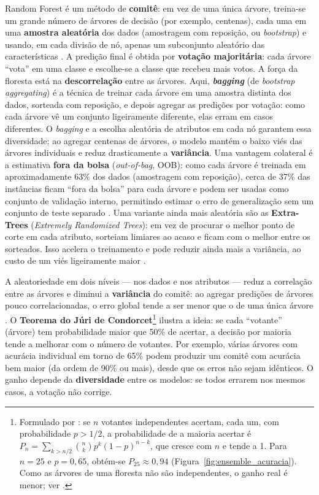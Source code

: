 Random Forest \citep{Breiman2001} é um método de \textbf{comitê}: em vez de uma única árvore, treina-se um grande número de árvores de decisão (por exemplo, centenas), cada uma em uma \textbf{amostra aleatória} dos dados (amostragem com reposição, ou \textit{bootstrap}) e usando, em cada divisão de nó, apenas um subconjunto aleatório das características \citep{geron2019maos, Levada2026}. A predição final é obtida por \textbf{votação majoritária}: cada árvore ``vota'' em uma classe e escolhe-se a classe que recebeu mais votos. A força da floresta está na \textbf{descorrelação} entre as árvores. Aqui, \textbf{\textit{bagging}} (de \textit{bootstrap aggregating}) é a técnica de treinar cada árvore em uma amostra distinta dos dados, sorteada com reposição, e depois agregar as predições por votação: como cada árvore vê um conjunto ligeiramente diferente, elas erram em casos diferentes. O \textit{bagging} e a escolha aleatória de atributos em cada nó garantem essa diversidade; ao agregar centenas de árvores, o modelo mantém o baixo viés das árvores individuais e reduz drasticamente a \textbf{variância}. Uma vantagem colateral é a estimativa \textbf{fora da bolsa} (\textit{out-of-bag}, OOB): como cada árvore é treinada em aproximadamente 63\% dos dados (amostragem com reposição), cerca de 37\% das instâncias ficam ``fora da bolsa'' para cada árvore e podem ser usadas como conjunto de validação interno, permitindo estimar o erro de generalização sem um conjunto de teste separado \citep{geron2019maos}. Uma variante ainda mais aleatória são as \textbf{Extra-Trees} (\textit{Extremely Randomized Trees}): em vez de procurar o melhor ponto de corte em cada atributo, sorteiam limiares ao acaso e ficam com o melhor entre os sorteados. Isso acelera o treinamento e pode reduzir ainda mais a variância, ao custo de um viés ligeiramente maior \citep{geron2019maos}.

A aleatoriedade em dois níveis --- nos dados e nos atributos --- reduz a correlação entre as árvores e diminui a \textbf{variância} do comitê: ao agregar predições de árvores pouco correlacionadas, o erro global tende a ser menor que o de uma única árvore \citep{geron2019maos}. O \textbf{Teorema do Júri de Condorcet}\footnote{Formulado por \citet{Condorcet1785}: se $n$ votantes independentes acertam, cada um, com probabilidade $p > 1/2$, a probabilidade de a maioria acertar é $P_n = \sum_{k > n/2} \binom{n}{k} p^k (1-p)^{n-k}$, que cresce com $n$ e tende a 1. Para $n = 25$ e $p = 0{,}65$, obtém-se $P_{25} \approx 0{,}94$ (Figura~\ref{fig:ensemble_acuracia}). Como as árvores de uma floresta não são independentes, o ganho real é menor; ver \citet{geron2019maos}.} ilustra a ideia: se cada ``votante'' (árvore) tem probabilidade maior que 50\% de acertar, a decisão por maioria tende a melhorar com o número de votantes. Por exemplo, várias árvores com acurácia individual em torno de 65\% podem produzir um comitê com acurácia bem maior (da ordem de 90\% ou mais), desde que os erros não sejam idênticos. O ganho depende da \textbf{diversidade} entre os modelos: se todos errarem nos mesmos casos, a votação não corrige.

